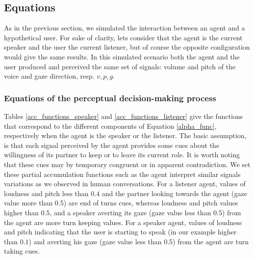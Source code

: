 
 
\subsection{Equations}

As in the previous section, we simulated the interaction between an agent and a hypothetical user. For sake of clarity, lets consider that the agent is the current speaker and the user the current listener, but of course the opposite configuration would give the same results. In this simulated scenario both the agent and the user produced and perceived the same set of signals: volume and pitch of the voice and gaze direction, resp. $v,p,g$.

\subsubsection{Equations of the perceptual decision-making process}

Tables \ref{acc_functions_speaker} and \ref{acc_functions_listener} give the functions that correspond to the different components of Equation \ref{alpha_func}, respectively when the agent is the speaker or the listener. 
The basic assumption, is that each signal perceived by the agent provides some cues about the willingness of its partner to keep or to leave its current role. It is worth noting that these cues may by temporary congruent or in apparent contradiction.
We set these partial accumulation functions such as the agent interpret similar signals variations as we observed in human conversations. For a listener agent, values of loudness and pitch less than $0.4$ and the partner looking towards the agent (gaze value more than 0.5) are end of turns cues, whereas loudness and pitch values higher than $0.5$, and a speaker averting its gaze (gaze value less than 0.5) from the agent are more turn keeping values. For a speaker agent, values of loudness and pitch indicating that the user is starting to speak (in our example higher than $0.1$) and averting his gaze (gaze value less than 0.5) from the agent are turn taking cues.

